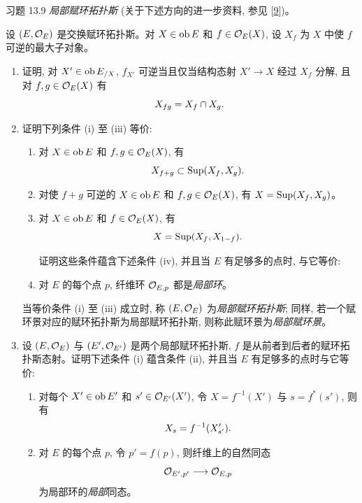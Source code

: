 \begin{enonce*}[remark]{习题 13.9}
\emph{局部赋环拓扑斯} (关于下述方向的进一步资料, 参见 [\hyperref[IV.sec9]{9}])。

设 $(E,{{\mathcal O}}_E)$ 是交换赋环拓扑斯。对 $X\in \operatorname{ob} E$ 和 $f\in {{\mathcal O}}_E(X)$, 设 $X_f$ 为 $X$ 中使 $f$ 可逆的最大子对象。
\begin{enumerate}
\renewcommand{\theenumi}{\alph{enumi}}
\renewcommand{\labelenumi}{\theenumi)}
\item 证明, 对 $X'\in \operatorname{ob} E_{/X}$, $f_{X'}$ 可逆当且仅当结构态射 $X'\rightarrow X$ 经过 $X_f$ 分解, 且对 $f,g\in {{\mathcal O}}_E(X)$ 有
$$
X_{fg}=X_f\cap X_g{}.
$$

\item 证明下列条件 (i) 至 (iii) 等价:
\begin{enumerate}
\renewcommand{\theenumii}{\roman{enumii}}
\renewcommand{\labelenumii}{(\theenumii)}
\item 对 $X\in \operatorname{ob} E$ 和 $f,g\in {{\mathcal O}}_E(X)$, 有
$$
X_{f+g}\subset \operatorname{Sup}(X_f,X_g).
$$

\item 对使 $f+g$ 可逆的 $X\in \operatorname{ob} E$ 和 $f,g\in {{\mathcal O}}_E(X)$, 有 $X=\operatorname{Sup}(X_f,X_g)$。

\item 对 $X\in \operatorname{ob} E$ 和 $f\in {{\mathcal O}}_E(X)$, 有
$$
X=\operatorname{Sup}(X_f,X_{1-f}){}.
$$

证明这些条件蕴含下述条件 (iv), 并且\pageoriginale 当 $E$ 有足够多的点时, 与它等价:

\item 对 $E$ 的每个点 $p$, 纤维环 ${{\mathcal O}}_{E,p}$ 都是\emph{局部环}。
\end{enumerate}

当等价条件 (i) 至 (iii) 成立时, 称 $(E,{{\mathcal O}}_E)$ 为\emph{局部赋环拓扑斯}; 同样, 若一个赋环景对应的赋环拓扑斯为局部赋环拓扑斯, 则称此赋环景为\emph{局部赋环景}。

\item 设 $(E,{{\mathcal O}}_E)$ 与 $(E',{{\mathcal O}}_{E'})$ 是两个局部赋环拓扑斯, $f$ 是从前者到后者的赋环拓扑斯态射。证明下述条件 (i) 蕴含条件 (ii), 并且当 $E$ 有足够多的点时与它等价:
\begin{enumerate}
\renewcommand{\theenumii}{\roman{enumii}}
\renewcommand{\labelenumii}{(\theenumii)}
\item 对每个 $X'\in \operatorname{ob} E'$ 和 $s'\in {{\mathcal O}}_{E'}(X')$, 令 $X=f^{-1}(X')$ 与 $s=f^{\ast}(s')$, 则有
$$
X_s=f^{-1}(X'_{s'}){}.
$$

\item 对 $E$ 的每个点 $p$, 令 $p'=f(p)$, 则纤维上的自然同态
$$
{{\mathcal O}}_{E',p'}\longrightarrow {{\mathcal O}}_{E,p}
$$
为局部环的\emph{局部}同态。
\end{enumerate}


\end{enumerate}
\end{enonce*}
